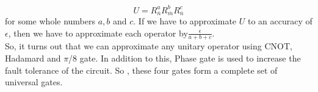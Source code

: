 \begin{equation}
U  = R^a_{\overline{n}}R^b_{\overline{m}}R^c_{\overline{n}}
\end{equation}
for some whole numbers $a,b$ and $c$. If we have to approximate $U$ to an accuracy of $\epsilon$, then we have to approximate each operator by$\frac{\epsilon}{a+b+c}$.\\
So, it turns out that we can approximate any unitary operator using CNOT, Hadamard and $\pi$/8 gate. In addition to this, Phase gate is used to increase the fault tolerance of the circuit. So , these four gates form a complete set of universal gates.\\
\newpage
